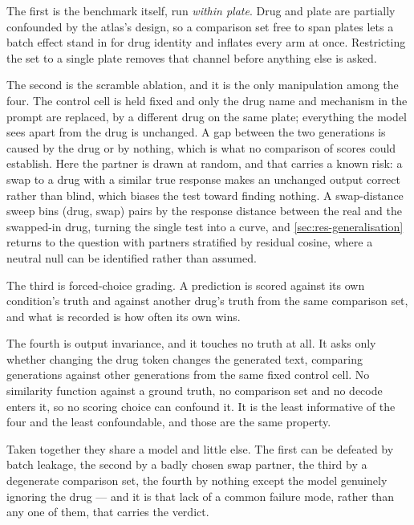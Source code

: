 The first is the benchmark itself, run \emph{within plate}. Drug and plate are
partially confounded by the atlas's design, so a comparison set free to span
plates lets a batch effect stand in for drug identity and inflates every arm at
once. Restricting the set to a single plate removes that channel before anything
else is asked.

The second is the scramble ablation, and it is the only manipulation among the
four. The control cell is held fixed and only the drug name and mechanism in the
prompt are replaced, by a different drug on the same plate; everything the model
sees apart from the drug is unchanged. A gap between the two generations is
caused by the drug or by nothing, which is what no comparison of scores could
establish. Here the partner is drawn at random, and that carries a known risk: a
swap to a drug with a similar true response makes an unchanged output correct
rather than blind, which biases the test toward finding nothing. A swap-distance
sweep bins (drug, swap) pairs by the response distance between the real and the
swapped-in drug, turning the single test into a curve, and
\cref{sec:res-generalisation} returns to the question with partners stratified by
residual cosine, where a neutral null can be identified rather than assumed.

The third is forced-choice grading. A prediction is scored against its own
condition's truth and against another drug's truth from the same comparison set,
and what is recorded is how often its own wins. 

The fourth is output invariance, and it touches no truth at all. It asks only
whether changing the drug token changes the generated text, comparing generations
against other generations from the same fixed control cell. No similarity
function against a ground truth, no comparison set and no decode enters it, so no
scoring choice can confound it. It is the least informative of the four and the
least confoundable, and those are the same property.

Taken together they share a model and little else. The first can be defeated by
batch leakage, the second by a badly chosen swap partner, the third by a
degenerate comparison set, the fourth by nothing except the model genuinely
ignoring the drug --- and it is that lack of a common failure mode, rather than
any one of them, that carries the verdict.

